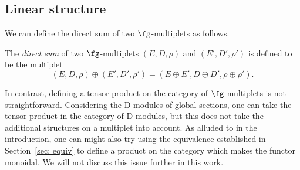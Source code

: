 \documentclass[10pt,a4paper]{amsart}
\numberwithin{equation}{section}
\def\cE{\mathcal E}\def\cF{\mathcal F}\def\cG{\mathcal G}\def\cH{\mathcal H}
\DeclareMathOperator{\id}{id}
\begin{document}
\subsection{Linear structure}

We can define the direct sum of two $\fg$-multiplets as follows.
\begin{dfn}
	The \emph{direct sum} of two $\fg$-multiplets $(E,D,\rho)$ and $(E',D',\rho')$ is defined to be the multiplet
	\begin{equation*}
	(E,D,\rho) \oplus (E',D',\rho') = (E\oplus E', D \oplus D', \rho \oplus \rho') .
	\end{equation*}
\end{dfn}


\begin{rmk}
	In contrast, defining a tensor product on the category of $\fg$-multiplets is not straightforward. Considering the D-modules of global sections, one can take the tensor product in the category of D-modules, but this does not take the additional structures on a multiplet into account. As alluded to in the introduction, one can might also try using the equivalence established in Section~\ref{sec: equiv} to define a product on the category which makes the functor monoidal. We will not discuss this issue further in this work.
\end{rmk}


\end{document}
